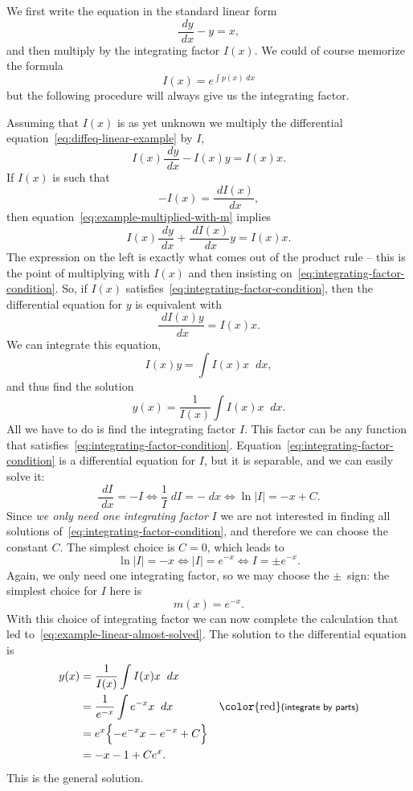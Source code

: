 \begin{solution}
We first write the equation in the standard linear form
\begin{equation}
  \label{eq:diffeq-linear-example}
  \frac{\; d y} {\; d x} - y = x,
\end{equation}
and then multiply by the integrating factor $I(x)$.  We could of course memorize
the formula 
\[
I(x) = e^{\int p(x)\;dx}
\]
but the following procedure will always give us the integrating factor.

Assuming that $I(x)$ is as yet unknown we multiply the differential
equation~\eqref{eq:diffeq-linear-example} by $I$,
\begin{equation}
  I(x)\frac{\; d y} {\; d x} - I(x) y = I(x)x.
  \label{eq:example-multiplied-with-m}
\end{equation}
If $I(x)$ is such that
\begin{equation}
  -I(x) = \frac{\; d I(x)} {\; d x},
  \label{eq:integrating-factor-condition}
\end{equation}
then equation~\eqref{eq:example-multiplied-with-m} implies
\[
  I(x)\frac{\; d y} {\; d x} + \frac{\; d I(x)} {\; d x} y = I(x)x.
\]
The expression on the left is exactly what comes out of the product rule -- this is
the point of multiplying with $I(x)$ and then insisting
on~\eqref{eq:integrating-factor-condition}.  So, if $I(x)$
satisfies~\eqref{eq:integrating-factor-condition}, then the differential equation for
$y$ is equivalent with
\[
\frac{\; d I(x) y} {\; d x} = I(x) x.
\]
We can integrate this equation,
\[
I(x) y = \int I(x) x \;\; d x,
\]
and thus find the solution
\begin{equation}
  y(x) =  \frac{1} {I(x)}  \int I(x) x \;\; d x.
  \label{eq:example-linear-almost-solved}
\end{equation}
All we have to do is find the integrating factor $I$.  This factor can be any
function that satisfies~\eqref{eq:integrating-factor-condition}.
Equation~\eqref{eq:integrating-factor-condition} is a differential equation for $I$,
but it is separable, and we can easily solve it:
\[
\frac{\; d I} {\; d x} = -I \iff
\frac{1} {I} \; d I = -\; d x \iff
\ln|I| = -x +C.
\]
Since \textit{we only need one integrating factor} $I$ we are not interested in
finding all solutions of~\eqref{eq:integrating-factor-condition}, and therefore we
can choose the constant $C$.  The simplest choice is $C=0$, which leads to
\[
\ln |I| = -x \iff |I| = e^{-x} \iff I = \pm e^{-x}. 
\]
Again, we only need one integrating factor, so we may choose the $\pm$~sign: the simplest
choice for $I$ here is
\[
m(x) = e^{-x}.
\]
With this choice of integrating factor we can now complete the calculation that led
to~\eqref{eq:example-linear-almost-solved}.  The solution to the differential
equation is
\begin{align*}
  y(x)
  &= \frac{1} {I(x)}  \int I(x) x \;\; d x \\
  &= \frac{1} {e^{-x}} \int e^{-x}x \;\; d x
  &\text{\color{red}\sffamily\footnotesize%
    (integrate by parts)}\\
  &= e^{x} \Bigl\{-e^{-x}x - e^{-x} + C\Bigr\} \\
  &= -x-1+Ce^x.
\end{align*}
This is the general solution.


\end{solution}
